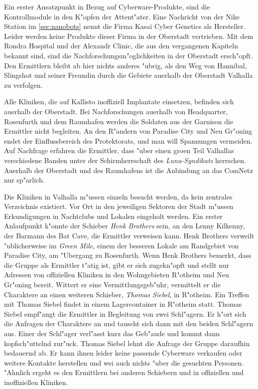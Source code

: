 Ein erster Ansatzpunkt in Bezug auf Cyberware-Produkte, sind die Kontrollmodule in den K"opfen der Attent"ater. Eine Nachricht von der Nike Station im \cref{sec:nanobots} nennt die Firma Kasai Cyber Genetics als Hersteller. Leider werden keine Produkte dieser Firma in der Oberstadt vertrieben. Mit dem Rondra Hospital und der Alexandr Clinic, die aus den vergangenen Kapiteln bekannt sind, sind die Nachforschungsm"oglichkeiten in der Oberstadt ersch"opft. Den Ermittlern bleibt ab hier nichts anderes "ubrig, als den Weg von Hannibal, Slingshot und seiner Freundin durch die Gebiete au\3erhalb der Oberstadt Valhalla zu verfolgen.

Alle Kliniken, die auf Kallisto inoffiziell Implantate einsetzen, befinden sich au\3erhalb der Oberstadt. Bei Nachforschungen au\3erhalb von Headquarter, Rosenfurth und dem Raumhafen werden die Soldaten aus der Garnison die Ermittler nicht begleiten. An den R"andern von Paradise City und Neu Gr"oning endet der Einflussbereich des Protektorats, und man will Spannungen vermeiden. Auf Nachfrage erfahren die Ermittler, dass "uber einen gro\3en Teil Valhallas verschiedene Banden unter der Schirmherrschaft des \emph{Luna-Syndikats} herrschen. Au\3erhalb der Oberstadt und des Raumhafens ist die Anbindung an das ComNetz nur sp"arlich.

Die Kliniken in Valhalla m"ussen einzeln besucht werden, da kein zentrales Verzeichnis existiert. Vor Ort in den jeweiligen Sektoren der Stadt m"ussen Erkundigungen in Nachtclubs und Lokalen eingeholt werden. Ein erster Anlaufpunkt k"onnte der Schieber \emph{Henk Brothers} sein, an den Lenny Kilkenny, der Barmann des Bat Cave, die Ermittler verweisen kann. Henk Brothers verweilt "ublicherweise im \emph{Green Mile}, einem der besseren Lokale am Randgebiet von Paradise City, am "Ubergang zu Rosenfurth. Wenn Henk Brothers bemerkt, dass die Gruppe als Ermittler t"atig ist, gibt er sich zugekn"opft und stellt nur Adressen von offiziellen Kliniken in den Wohngebieten R"otheim und Neu Gr"oning bereit. Wittert er eine Vermittlungsgeb"uhr, vermittelt er die Charaktere an einen weiteren Schieber, \emph{Thomas Siebel}, in R"otheim. Ein Treffen mit Thomas Siebel findet in einem Lagercontainer in R"otheim statt. Thomas Siebel empf"angt die Ermittler in Begleitung von zwei Schl"agern. Er h"ort sich die Anfragen der Charaktere an und tauscht sich dann mit den beiden Schl"agern aus. Einer der Schl"ager verl"asst kurz das Geb"aude und kommt dann kopfsch"uttelnd zur"uck. Thomas Siebel lehnt die Anfrage der Gruppe daraufhin bedauernd ab. Er kann ihnen leider keine passende Cyberware verkaufen oder weitere Kontakte herstellen und wei\3 auch nichts "uber die gesuchten Personen. "Ahnlich ergeht es den Ermittlern bei anderen Schiebern und in offiziellen und inoffiziellen Kliniken.

